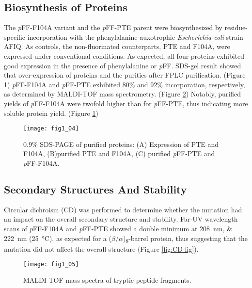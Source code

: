 \begin{refsection}
\subsection{Biosynthesis of Proteins}

The \emph{p}FF-F104A variant and the \emph{p}FF-PTE parent were biosynthesized
by residue-specific incorporation with the phenylalanine auxotrophic
\emph{Escherichia coli} strain AFIQ\cite{Yang2014a}. As controls, the
non-fluorinated counterparts, PTE and F104A, were expressed under conventional
conditions. As expected, all four proteins exhibited good expression in the
presence of phenylalanine or \emph{p}FF. SDS-gel result showed that
over-expression of proteins and the purities after FPLC purification. (Figure
\ref{fig:sds-gel}) \emph{p}FF-F104A and \emph{p}FF-PTE exhibited 80\% and 92\%
incorporation, respectively, as determined by MALDI-TOF
mass spectrometry. (Figure \ref{fig:MALDI-fig}) Notably, purified yields of
\emph{p}FF-F104A were twofold higher than for \emph{p}FF-PTE, thus indicating
more soluble protein yield. (Figure \ref{fig:sds-gel})

\begin{figure}[h!] \centering \texttt{[image: fig1\_04]}
    \caption[0.9\% SDS-PAGE of purified proteins: (A) Expression of PTE and
    F104A, (B)purified PTE and F104A, (C) purified \emph{p}FF-PTE and
\emph{p}FF-F104A.]{0.9\% SDS-PAGE of purified proteins: (A) Expression of PTE
    and F104A, (B)purified PTE and F104A, (C) purified \emph{p}FF-PTE and
    \emph{p}FF-F104A.} 
    \label{fig:sds-gel}
\end{figure}

\subsection{Secondary Structures And Stability}

Circular dichroism (CD) was performed to determine whether the mutation had an
impact on the overall secondary structure and stability. Far-UV wavelength
scans of \emph{p}FF-F104A and \emph{p}FF-PTE showed a double minimum at
\SIlist{208;222}{\nm} (\SI{25}{\celsius}), as expected for a
($\beta$/$\alpha$)\textsubscript{8}-barrel protein, thus suggesting that the
mutation did not affect the overall structure (Figure \ref{fig:CD-fig}).  

\begin{figure}[h!] \centering \texttt{[image: fig1\_05]}
    \caption[MALDI-TOF mass spectra of tryptic peptide fragments.]{MALDI-TOF
    mass spectra of tryptic peptide fragments.} \label{fig:MALDI-fig} 
\end{figure}


\end{refsection}
